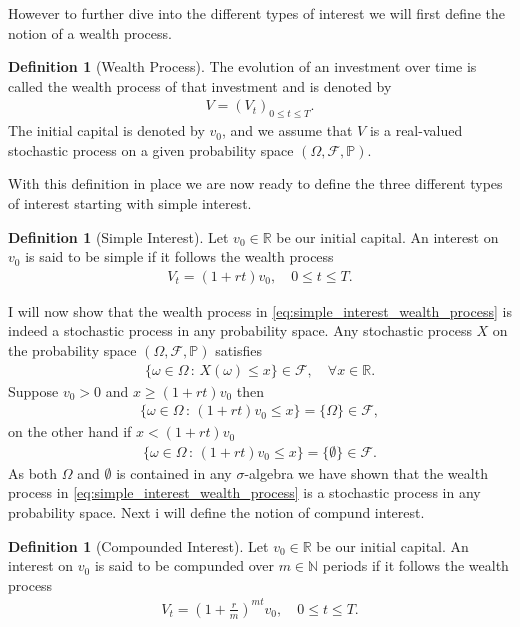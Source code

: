 \documentclass{article}
\theoremstyle{definition}
\newtheorem{definition}[theorem]{Definition}
\numberwithin{equation}{section}
\begin{document}
However to further dive into the different types of interest we will first define the notion of a wealth process.
\begin{definition}[Wealth Process]
    The evolution of an investment over time is called the wealth process of that investment and is denoted by
    \begin{align}
        V = (V_t)_{0 \leq t \leq T}.
    \end{align}
    The initial capital is denoted by $v_0$, and we assume that $V$ is a real-valued stochastic process on a given probability space $(\Omega, \mathscr{F}, \mathbb{P})$.
\end{definition}
With this definition in place we are now ready to define the three different types of interest starting with simple interest.
\begin{definition}[Simple Interest]
    Let $v_0 \in \mathbb{R}$ be our initial capital.
    An interest on $v_0$ is said to be simple if it follows the wealth process
    \begin{align}\label{eq:simple_interest_wealth_process}
        V_t = (1 + rt)v_0, \quad 0 \leq t \leq T.
    \end{align}
\end{definition}
I will now show that the wealth process in \eqref{eq:simple_interest_wealth_process} is indeed a stochastic process in any probability space.
Any stochastic process $X$ on the probability space $(\Omega, \mathscr{F}, \mathbb{P})$ satisfies
\begin{align}
    \{\omega \in \Omega \, : \, X(\omega) \leq x\} \in \mathscr{F}, \quad \forall x \in \mathbb{R}.
\end{align}
Suppose $v_0 > 0$ and $x \geq (1 + rt)v_0$ then
\begin{align}
    \{\omega \in \Omega \, : \, (1 + rt)v_0 \leq x\} = \{\Omega\} \in \mathscr{F},
\end{align}
on the other hand if $x < (1 + rt)v_0$
\begin{align}
    \{\omega \in \Omega \, : \, (1 + rt)v_0 \leq x\} = \{\emptyset\} \in \mathscr{F}.
\end{align}
As both $\Omega$ and $\emptyset$ is contained in any $\sigma$-algebra we have shown that the wealth process in \eqref{eq:simple_interest_wealth_process} is a stochastic process in any probability space.
Next i will define the notion of compund interest.
\begin{definition}[Compounded Interest]
    Let $v_0 \in \mathbb{R}$ be our initial capital.
    An interest on $v_0$ is said to be compunded over $m\in\mathbb{N}$ periods if it follows the wealth process
    \begin{align}\label{eq:compund_interest_wealth_process}
        V_t = \left( 1 + \frac{r}{m} \right)^{mt} v_0, \quad 0 \leq t \leq T.
    \end{align}
\end{definition}
\end{document}
